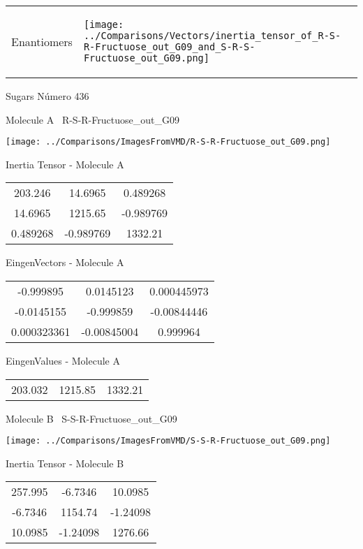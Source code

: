\vtab[-5mm]
\begin{tabular}{*{2}{m{}}}
\begin{center}
\textcolor{NavyBlue}{\Large Enantiomers}
\end{center}
&
\begin{center}
\texttt{[image: ../Comparisons/Vectors/inertia\_tensor\_of\_R-S-R-Fructuose\_out\_G09\_and\_S-R-S-Fructuose\_out\_G09.png]}
\end{center}
\end{tabular}

 \newpage

\vtab[-3cm]
\begin{center}
{\large Sugars \tab Número 436}
\end{center}
\begin{multicols}{2}
\begin{center}

Molecule A \
R-S-R-Fructuose\_out\_G09

\texttt{[image: ../Comparisons/ImagesFromVMD/R-S-R-Fructuose\_out\_G09.png]}

Inertia Tensor - Molecule A \\
\begin{tabular}{|c c c|}
203.246	 & 	14.6965	 & 	0.489268	 \\
14.6965	 & 	1215.65	 & 	-0.989769	 \\
0.489268	 & 	-0.989769	 & 	1332.21
\end{tabular}

\vtab
 EingenVectors - Molecule A     \\
\begin{tabular}{|c c c|}
-0.999895	 & 	0.0145123	 & 	0.000445973	 \\
-0.0145155	 & 	-0.999859	 & 	-0.00844446	 \\
0.000323361	 & 	-0.00845004	 & 	0.999964
\end{tabular}

\vtab
 EingenValues - Molecule A     \\
\begin{tabular}{|c c c|}
203.032	 & 	1215.85	 & 	1332.21	 \\
\end{tabular}
\columnbreak

Molecule B \
S-S-R-Fructuose\_out\_G09

\texttt{[image: ../Comparisons/ImagesFromVMD/S-S-R-Fructuose\_out\_G09.png]}

Inertia Tensor - Molecule B \\
\begin{tabular}{|c c c|}
257.995	 & 	-6.7346	 & 	10.0985	 \\
-6.7346	 & 	1154.74	 & 	-1.24098	 \\
10.0985	 & 	-1.24098	 & 	1276.66
\end{tabular}


\end{center}
\end{multicols}
